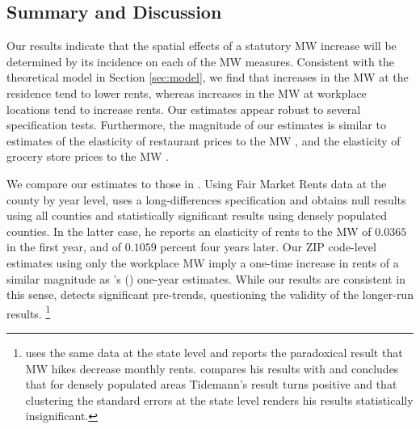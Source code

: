 \subsection{Summary and Discussion}
\label{sec:results_discussion}

Our results indicate that the spatial effects of a statutory MW increase will 
be determined by its incidence on each of the MW measures.
Consistent with the theoretical model in Section \ref{sec:model}, we find that 
increases in the MW at the residence tend to lower rents, whereas increases 
in the MW at workplace locations tend to increase rents.
Our estimates appear robust to several specification tests.
Furthermore, the magnitude of our estimates is similar to estimates of the
elasticity of restaurant prices to the MW \parencite{AllegrettoReich2018},
and the elasticity of grocery store prices to the MW 
\parencite{RenkinEtAl2020, Leung2021}.

We compare our estimates to those in \textcite{Yamagishi2019, AgarwalEtAl2021}.
Using Fair Market Rents data at the county by year level, 
\textcite[][, Tables 1 and 2]{Yamagishi2019} uses a long-differences 
specification and obtains null results using all counties and statistically 
significant results using densely populated counties.
In the latter case, he reports an elasticity of rents to the MW of $0.0365$
in the first year, and of $0.1059$ percent four years later.
Our ZIP code-level estimates using only the workplace MW imply a one-time 
increase in rents of a similar magnitude as \citeauthor{Yamagishi2019}'s 
(\citeyear[][Table 2, Column 1]{Yamagishi2019}) one-year estimates.
While our results are consistent in this sense, 
\textcite[][Table 3]{Yamagishi2019} detects significant pre-trends,
questioning the validity of the longer-run results.%
\footnote{\textcite{Tidemann2018} uses the same data at the state level and 
    reports the paradoxical result that MW hikes decrease monthly rents.
    \textcite[][, Appendix C.1.3.]{Yamagishi2019} compares his results with 
    \textcite{Tidemann2018} and concludes that for densely populated areas 
    Tidemann's result turns positive and that clustering the standard errors at 
    the state level renders his results statistically insignificant.}

